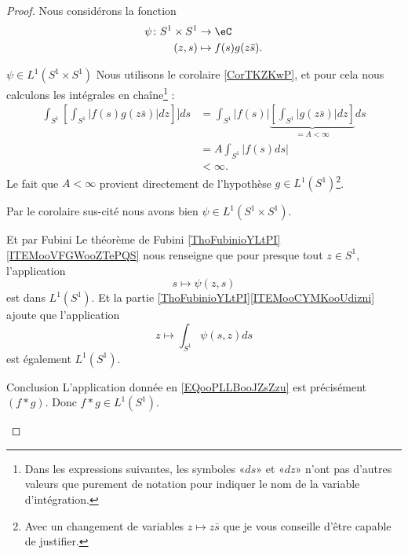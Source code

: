\begin{proof}
    Nous considérons la fonction
    \begin{equation}
        \begin{aligned}
            \psi\colon S^1\times S^1&\to \eC \\
            (z,s)&\mapsto f(s)g(z\bar s). 
        \end{aligned}
    \end{equation}
    \begin{subproof}
    \item[\( \psi\in L^1(S^1\times S^1)\)]
        Nous utilisons le corolaire \ref{CorTKZKwP}, et pour cela nous calculons les intégrales en chaîne\footnote{Dans les expressions suivantes, les symboles «\( ds\)» et «\( dz\)» n'ont pas d'autres valeurs que purement de notation pour indiquer le nom de la variable d'intégration.} :
        \begin{subequations}
            \begin{align}
                \int_{S^1}\left[ \int_{S^1}| f(s)g(z\bar s) |dz \right]]ds&=\int_{S^1}| f(s) |\underbrace{\left[ \int_{S^1}| g(z\bar s) |dz \right]}_{=A<\infty}ds\\
                &=A\int_{S^1}| f(s)ds |\\
                &<\infty.
            \end{align}
        \end{subequations}
        Le fait que \( A<\infty\) provient directement de l'hypothèse \( g\in L^1(S^1)\)\footnote{Avec un changement de variables \( z\mapsto z\bar s\) que je vous conseille d'être capable de justifier.}.
        
        Par le corolaire sus-cité nous avons bien \( \psi\in L^1(S^1\times S^1)\).
    \item[Et par Fubini]
        Le théorème de Fubini \ref{ThoFubinioYLtPI}\ref{ITEMooVFGWooZTePQS} nous renseigne que pour presque tout \( z\in S^1\), l'application
        \begin{equation}
            s\mapsto \psi(z,s)
        \end{equation}
        est dans \( L^1(S^1)\). Et la partie \ref{ThoFubinioYLtPI}\ref{ITEMooCYMKooUdizni} ajoute que l'application
        \begin{equation}        \label{EQooPLLBooJZsZzu}
            z\mapsto \int_{S^1}\psi(s,z)ds
        \end{equation}
        est également \( L^1(S^1)\).
    \item[Conclusion]
        L'application donnée en \eqref{EQooPLLBooJZsZzu} est précisément \( (f*g)\). Donc \( f*g\in L^1(S^1)\).
    \end{subproof}
\end{proof}

